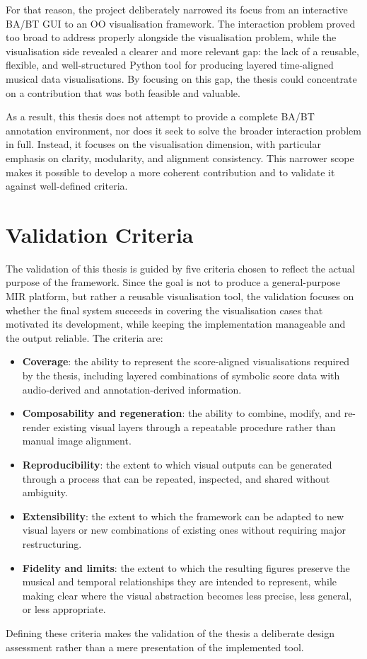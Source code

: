 For that reason, the project deliberately narrowed its focus from an interactive BA/BT GUI to an OO visualisation framework. The interaction problem proved too broad to address properly alongside the visualisation problem, while the visualisation side revealed a clearer and more relevant gap: the lack of a reusable, flexible, and well-structured Python tool for producing layered time-aligned musical data visualisations. By focusing on this gap, the thesis could concentrate on a contribution that was both feasible and valuable.

As a result, this thesis does not attempt to provide a complete BA/BT annotation environment, nor does it seek to solve the broader interaction problem in full. Instead, it focuses on the visualisation dimension, with particular emphasis on clarity, modularity, and alignment consistency. This narrower scope makes it possible to develop a more coherent contribution and to validate it against well-defined criteria.

\section{Validation Criteria}
The validation of this thesis is guided by five criteria chosen to reflect the actual purpose of the framework. Since the goal is not to produce a general-purpose MIR platform, but rather a reusable visualisation tool, the validation focuses on whether the final system succeeds in covering the visualisation cases that motivated its development, while keeping the implementation manageable and the output reliable. The criteria are:

\begin{itemize}
    \item \textbf{Coverage}: the ability to represent the score-aligned visualisations required by the thesis, including layered combinations of symbolic score data with audio-derived and annotation-derived information.
    \item \textbf{Composability and regeneration}: the ability to combine, modify, and re-render existing visual layers through a repeatable procedure rather than manual image alignment.
    \item \textbf{Reproducibility}: the extent to which visual outputs can be generated through a process that can be repeated, inspected, and shared without ambiguity.
    \item \textbf{Extensibility}: the extent to which the framework can be adapted to new visual layers or new combinations of existing ones without requiring major restructuring.
    \item \textbf{Fidelity and limits}: the extent to which the resulting figures preserve the musical and temporal relationships they are intended to represent, while making clear where the visual abstraction becomes less precise, less general, or less appropriate.
\end{itemize}

Defining these criteria makes the validation of the thesis a deliberate design assessment rather than a mere presentation of the implemented tool.